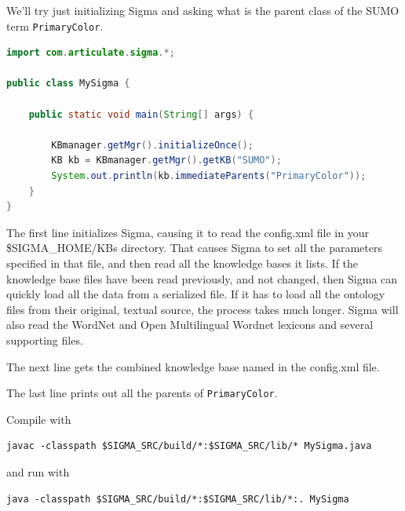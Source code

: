 \documentclass{book}
\begin{document}
We'll try just initializing Sigma and asking what is the parent class of the
SUMO term \texttt{PrimaryColor}.

\begin{lstlisting}[language=java, basicstyle=\ttfamily\small\bfseries]
import com.articulate.sigma.*;

public class MySigma {

    public static void main(String[] args) {

        KBmanager.getMgr().initializeOnce();
        KB kb = KBmanager.getMgr().getKB("SUMO");
        System.out.println(kb.immediateParents("PrimaryColor"));
    }
}
\end{lstlisting}

The first line initializes Sigma, causing it to read the config.xml file in
your \$SIGMA\_HOME/KBs directory.  That causes Sigma to set all the parameters
specified in that file, and then read all the knowledge bases it lists.  If
the knowledge base files have been read previously, and not changed, then Sigma
can quickly load all the data from a serialized file.  If it has to load all the
ontology files from their original, textual source, the process takes much longer.
Sigma will also read the WordNet and Open Multilingual Wordnet lexicons and several
supporting files.

The next line gets the combined knowledge base named in the config.xml file.

The last line prints out all the parents of \texttt{PrimaryColor}.

Compile with

\begin{lstlisting}[basicstyle=\ttfamily\small\bfseries]
javac -classpath $SIGMA_SRC/build/*:$SIGMA_SRC/lib/* MySigma.java
\end{lstlisting}

and run with

\begin{lstlisting}[basicstyle=\ttfamily\small\bfseries]
java -classpath $SIGMA_SRC/build/*:$SIGMA_SRC/lib/*:. MySigma
\end{lstlisting}
\end{document}
